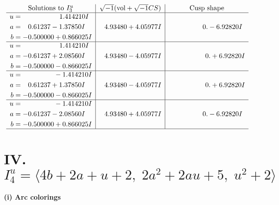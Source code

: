 \documentclass[1p]{elsarticle_modified}
\theoremstyle{definition}
\newcommand{\I}{\sqrt{-1}}
\begin{document}
$$\begin{array}{c|c|c}  
\text{Solutions to }I^u_{3}& \I (\text{vol} + \sqrt{-1}CS) & \text{Cusp shape}\\
 \hline 
\begin{aligned}
u &= \phantom{-0.000000 -}1.414210 I \\
a &= \phantom{-}0.61237 - 1.37850 I \\
b &= -0.500000 + 0.866025 I\end{aligned}
 & \phantom{-}4.93480 + 4.05977 I & \phantom{-0.000000 } 0. - 6.92820 I \\ \hline\begin{aligned}
u &= \phantom{-0.000000 -}1.414210 I \\
a &= -0.61237 + 2.08560 I \\
b &= -0.500000 - 0.866025 I\end{aligned}
 & \phantom{-}4.93480 - 4.05977 I & \phantom{-0.000000 -}0. + 6.92820 I \\ \hline\begin{aligned}
u &= \phantom{-0.000000 } -1.414210 I \\
a &= \phantom{-}0.61237 + 1.37850 I \\
b &= -0.500000 - 0.866025 I\end{aligned}
 & \phantom{-}4.93480 - 4.05977 I & \phantom{-0.000000 -}0. + 6.92820 I \\ \hline\begin{aligned}
u &= \phantom{-0.000000 } -1.414210 I \\
a &= -0.61237 - 2.08560 I \\
b &= -0.500000 + 0.866025 I\end{aligned}
 & \phantom{-}4.93480 + 4.05977 I & \phantom{-0.000000 } 0. - 6.92820 I\\
 \hline 
 \end{array}$$\newpage\newpage\renewcommand{\arraystretch}{1}
\centering \section*{IV. $I^u_{4}= \langle 4 b+2 a+u+2,\;2 a^2+2 a u+5,\;u^2+2 \rangle$}
\flushleft \textbf{(i) Arc colorings}\\
\end{document}
